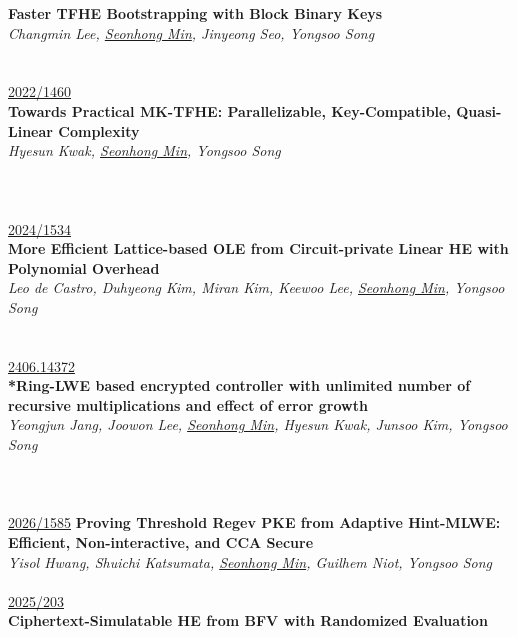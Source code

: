\documentclass[a4paper, 10pt, twocolumn]{article}
\begin{document}
\textbf{Faster TFHE Bootstrapping with Block Binary Keys} \\
\textit{Changmin Lee, \underline{Seonhong Min}, Jinyeong Seo, Yongsoo Song} \\
 \\
\\
 {\small \href{https://eprint.iacr.org/2022/1460}{2022/1460}}\\
\textbf{Towards Practical MK-TFHE: Parallelizable, Key-Compatible, Quasi-Linear Complexity} \\
\textit{Hyesun Kwak, \underline{Seonhong Min}, Yongsoo Song} \\
 \\
\\
\\
 {\small \href{https://eprint.iacr.org/2024/1534}{2024/1534}}\\
\textbf{More Efficient Lattice-based OLE from Circuit-private Linear HE with Polynomial Overhead} \\
\textit{Leo de Castro, Duhyeong Kim, Miran Kim, Keewoo Lee, \underline{Seonhong Min}, Yongsoo Song} \\
 \\
\\
 {\small \href{https://arxiv.org/pdf/2406.14372}{2406.14372}}\\
\textbf{*Ring-LWE based encrypted controller with unlimited number of recursive multiplications and effect of error growth} \\
\textit{Yeongjun Jang, Joowon Lee, \underline{Seonhong Min}, Hyesun Kwak, Junsoo Kim, Yongsoo Song} \\
 \\
\\
\\
 {\small \href{https://eprint.iacr.org/2026/1585}{2026/1585}}
\textbf{Proving Threshold Regev PKE from Adaptive Hint-MLWE: Efficient, Non-interactive, and CCA Secure} \\
\textit{Yisol Hwang, Shuichi Katsumata, \underline{Seonhong Min}, Guilhem Niot, Yongsoo Song} \\
\\
 {\small \href{https://eprint.iacr.org/2025/203}{2025/203}}\\ 
\textbf{Ciphertext-Simulatable HE from BFV with Randomized Evaluation} \\
\end{document}
